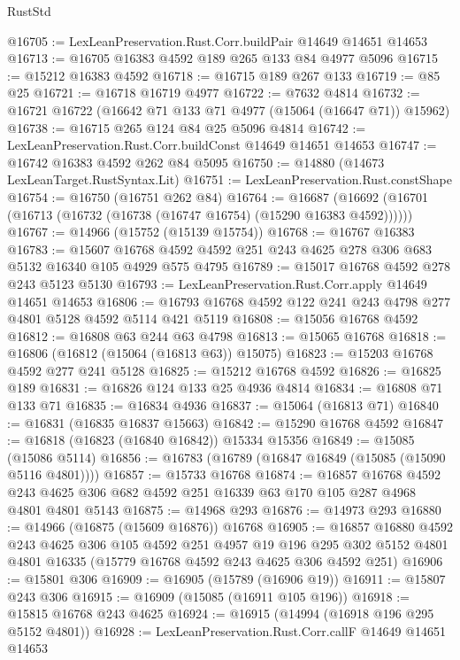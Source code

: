 \begin{lexlean}{RustStd}
\begin{coremodule}
@16705 := LexLeanPreservation.Rust.Corr.buildPair @14649 @14651 @14653
@16713 := @16705 @16383 @4592 @189 @265 @133 @84 @4977 @5096
@16715 := @15212 @16383 @4592
@16718 := @16715 @189 @267 @133
@16719 := @85 @25
@16721 := @16718 @16719 @4977
@16722 := @7632 @4814
@16732 := @16721 @16722 (@16642 @71 @133 @71 @4977 (@15064 (@16647 @71)) @15962)
@16738 := @16715 @265 @124 @84 @25 @5096 @4814
@16742 := LexLeanPreservation.Rust.Corr.buildConst @14649 @14651 @14653
@16747 := @16742 @16383 @4592 @262 @84 @5095
@16750 := @14880 (@14673 LexLeanTarget.RustSyntax.Lit)
@16751 := LexLeanPreservation.Rust.constShape
@16754 := @16750 (@16751 @262 @84)
@16764 := @16687 (@16692 (@16701 (@16713 (@16732 (@16738 (@16747 @16754) (@15290 @16383 @4592))))))
@16767 := @14966 (@15752 (@15139 @15754))
@16768 := @16767 @16383
@16783 := @15607
    @16768
    @4592
    @4592
    @251
    @243
    @4625
    @278
    @306
    @683
    @5132
    @16340
    @105
    @4929
    @575
    @4795
@16789 := @15017 @16768 @4592 @278 @243 @5123 @5130
@16793 := LexLeanPreservation.Rust.Corr.apply @14649 @14651 @14653
@16806 := @16793 @16768 @4592 @122 @241 @243 @4798 @277 @4801 @5128 @4592 @5114 @421 @5119
@16808 := @15056 @16768 @4592
@16812 := @16808 @63 @244 @63 @4798
@16813 := @15065 @16768
@16818 := @16806 (@16812 (@15064 (@16813 @63)) @15075)
@16823 := @15203 @16768 @4592 @277 @241 @5128
@16825 := @15212 @16768 @4592
@16826 := @16825 @189
@16831 := @16826 @124 @133 @25 @4936 @4814
@16834 := @16808 @71 @133 @71
@16835 := @16834 @4936
@16837 := @15064 (@16813 @71)
@16840 := @16831 (@16835 @16837 @15663)
@16842 := @15290 @16768 @4592
@16847 := @16818 (@16823 (@16840 @16842)) @15334 @15356
@16849 := @15085 (@15086 @5114)
@16856 := @16783 (@16789 (@16847 @16849 (@15085 (@15090 @5116 @4801))))
@16857 := @15733 @16768
@16874 := @16857
    @16768
    @4592
    @243
    @4625
    @306
    @682
    @4592
    @251
    @16339
    @63
    @170
    @105
    @287
    @4968
    @4801
    @4801
    @5143
@16875 := @14968 @293
@16876 := @14973 @293
@16880 := @14966 (@16875 (@15609 @16876)) @16768
@16905 := @16857
    @16880
    @4592
    @243
    @4625
    @306
    @105
    @4592
    @251
    @4957
    @19
    @196
    @295
    @302
    @5152
    @4801
    @4801
    @16335
    (@15779 @16768 @4592 @243 @4625 @306 @4592 @251)
@16906 := @15801 @306
@16909 := @16905 (@15789 (@16906 @19))
@16911 := @15807 @243 @306
@16915 := @16909 (@15085 (@16911 @105 @196))
@16918 := @15815 @16768 @243 @4625
@16924 := @16915 (@14994 (@16918 @196 @295 @5152 @4801))
@16928 := LexLeanPreservation.Rust.Corr.callF @14649 @14651 @14653

\end{coremodule}
\end{lexlean}
